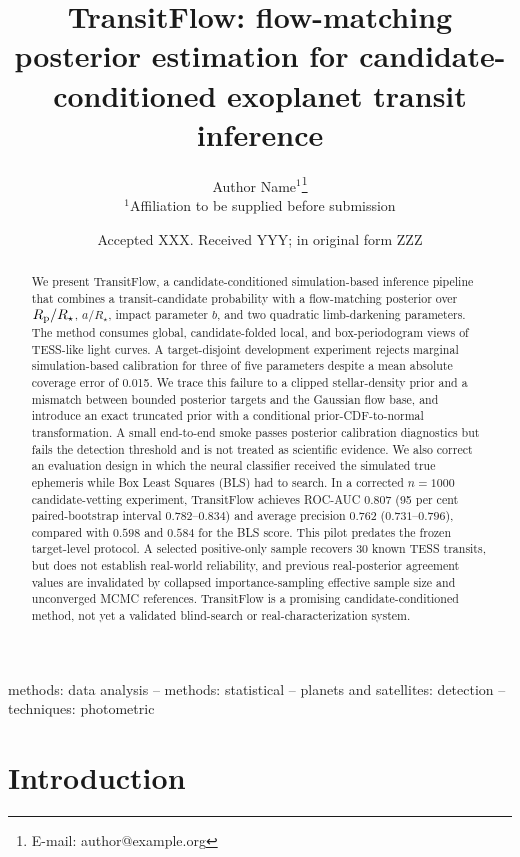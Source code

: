 \documentclass[fleqn,usenatbib]{mnras}
\title[Candidate-conditioned transit inference]{TransitFlow: flow-matching posterior estimation for candidate-conditioned exoplanet transit inference}
\author[Author et al.]{Author Name$^{1}$\thanks{E-mail: author@example.org}\\
$^{1}$Affiliation to be supplied before submission}
\date{Accepted XXX. Received YYY; in original form ZZZ}
\begin{document}
\label{firstpage}
\pagerange{\pageref{firstpage}--\pageref{lastpage}}
\maketitle

\begin{abstract}
We present TransitFlow, a candidate-conditioned simulation-based inference
pipeline that combines a transit-candidate probability with a flow-matching
posterior over $R_{\rm p}/R_\star$, $a/R_\star$, impact parameter $b$, and two
quadratic limb-darkening parameters. The method consumes global, candidate-folded
local, and box-periodogram views of TESS-like light curves. A
target-disjoint development experiment rejects marginal simulation-based
calibration for three of five parameters despite a mean absolute coverage error
of 0.015. We trace this failure to a clipped stellar-density prior and a mismatch
between bounded posterior targets and the Gaussian flow base, and introduce an
exact truncated prior with a conditional prior-CDF-to-normal transformation. A
small end-to-end smoke passes posterior calibration diagnostics but fails the
detection threshold and is not treated as scientific evidence. We also correct an
evaluation design in which the neural classifier received the simulated true
ephemeris while Box Least Squares (BLS) had to search. In a corrected
$n=1000$ candidate-vetting experiment, TransitFlow achieves ROC-AUC $0.807$
(95 per cent paired-bootstrap interval $0.782$--$0.834$) and average precision
$0.762$ ($0.731$--$0.796$), compared with $0.598$ and $0.584$ for the BLS score.
This pilot predates the frozen target-level protocol. A selected positive-only
sample recovers 30 known TESS
transits, but does not establish real-world reliability, and previous
real-posterior agreement values are invalidated by collapsed importance-sampling
effective sample size and unconverged MCMC references. TransitFlow is a
promising candidate-conditioned method, not yet a validated blind-search or
real-characterization system.
\end{abstract}

\begin{keywords}
methods: data analysis -- methods: statistical -- planets and satellites:
detection -- techniques: photometric
\end{keywords}

\section{Introduction}
\label{sec:introduction}
\end{document}
